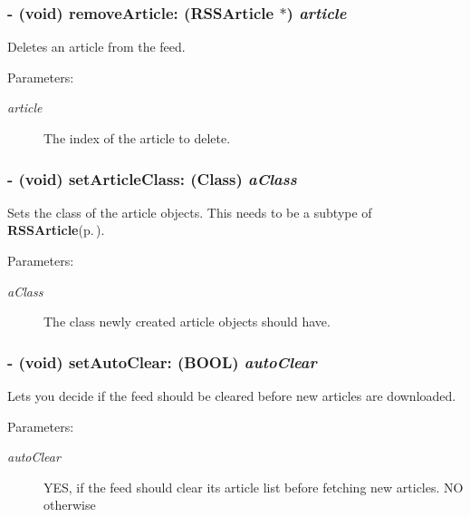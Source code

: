 \subsubsection{\setlength{\rightskip}{0pt plus 5cm}- (void) remove\-Article: ({\bf RSSArticle} $\ast$) {\em article}}\label{interfaceRSSFeed_a9}


Deletes an article from the feed.

\begin{Desc}
\item[Parameters:]
\begin{description}
\item[{\em article}]The index of the article to delete.\end{description}
\end{Desc}
\subsubsection{\setlength{\rightskip}{0pt plus 5cm}- (void) set\-Article\-Class: (Class) {\em a\-Class}}\label{interfaceRSSFeed_a17}


Sets the class of the article objects. This needs to be a subtype of {\bf RSSArticle}{\rm (p.\,\pageref{interfaceRSSArticle})}.

\begin{Desc}
\item[Parameters:]
\begin{description}
\item[{\em a\-Class}]The class newly created article objects should have.\end{description}
\end{Desc}
\subsubsection{\setlength{\rightskip}{0pt plus 5cm}- (void) set\-Auto\-Clear: (BOOL) {\em auto\-Clear}}\label{interfaceRSSFeed_a14}


Lets you decide if the feed should be cleared before new articles are downloaded.

\begin{Desc}
\item[Parameters:]
\begin{description}
\item[{\em auto\-Clear}]YES, if the feed should clear its article list before fetching new articles. NO otherwise\end{description}
\end{Desc}
